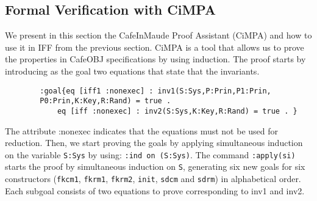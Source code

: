 \documentclass[a4paper,fleqn]{cas-dc}
\begin{document}
\subsection{Formal Verification with CiMPA} \label{cimpa}
We present in this section the CafeInMaude Proof Assistant (CiMPA) and how to use it in IFF from the previous section. CiMPA is a tool that allows us to prove the properties in CafeOBJ specifications by using induction. The proof starts by introducing as the goal two equations that state that the invariants.
	\begin{verbatim}
		:goal{eq [iff1 :nonexec] : inv1(S:Sys,P:Prin,P1:Prin,
		P0:Prin,K:Key,R:Rand) = true .
			eq [iff :nonexec] : inv2(S:Sys,K:Key,R:Rand) = true . }
	\end{verbatim}
	\noindent
The attribute :nonexec indicates that the equations must not be used for reduction.
Then, we start proving the goals by applying simultaneous
induction on the variable \verb!S:Sys! by using: \verb!:ind on (S:Sys)!.
The command \verb!:apply(si)! starts the proof by simultaneous induction on \verb!S!, generating six new goals for six constructors (\verb!fkcm1!, \verb!fkrm1!, \verb!fkrm2!, \verb!init!, \verb!sdcm! and \verb!sdrm!) in alphabetical order. Each subgoal consists of two equations to prove corresponding to inv1 and inv2. 
\end{document}
